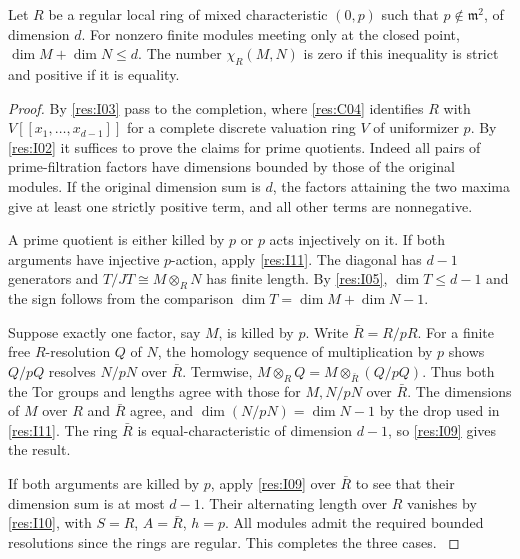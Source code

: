 \begin{theorem}\label{res:I12}
Let \(R\) be a regular local ring of mixed characteristic
\((0,p)\) such that \(p\notin\mathfrak m^2\), of dimension
\(d\). For nonzero finite modules meeting only at the closed
point, \(\dim M+\dim N\le d\). The number \(\chi_R(M,N)\)
is zero if this inequality is strict and positive if it is
equality.
\end{theorem}
\begin{proof}
By \ref{res:I03} pass to the completion, where \ref{res:C04}
identifies \(R\) with \(V[[x_1,\ldots,x_{d-1}]]\) for
a complete discrete valuation ring \(V\) of uniformizer \(p\).
By \ref{res:I02} it suffices to prove the claims for prime
quotients. Indeed all pairs of prime-filtration factors
have dimensions bounded by those of the original modules.
If the original dimension sum is \(d\), the factors attaining
the two maxima give at least one strictly positive term, and
all other terms are nonnegative.

A prime quotient is either killed by \(p\) or \(p\) acts
injectively on it. If both arguments have injective \(p\)-action,
apply \ref{res:I11}. The diagonal has \(d-1\) generators and
\(T/JT\cong M\otimes_R N\) has finite length. By \ref{res:I05},
\(\dim T\le d-1\) and the sign follows from the comparison
\(\dim T=\dim M+\dim N-1\).

Suppose exactly one factor, say \(M\), is killed by \(p\).
Write \(\bar R=R/pR\). For a finite free \(R\)-resolution
\(Q\) of \(N\), the homology sequence of multiplication by \(p\)
shows \(Q/pQ\) resolves \(N/pN\) over \(\bar R\). Termwise,
\(M\otimes_R Q=M\otimes_{\bar R}(Q/pQ)\). Thus both the
Tor groups and lengths agree with those for \(M,N/pN\) over
\(\bar R\). The dimensions of \(M\) over \(R\) and \(\bar R\)
agree, and \(\dim(N/pN)=\dim N-1\) by the drop used in
\ref{res:I11}. The ring \(\bar R\) is equal-characteristic
of dimension \(d-1\), so \ref{res:I09} gives the result.

If both arguments are killed by \(p\), apply \ref{res:I09}
over \(\bar R\) to see that their dimension sum is at most
\(d-1\). Their alternating length over \(R\) vanishes by
\ref{res:I10}, with \(S=R\), \(A=\bar R\), \(h=p\).
All modules admit the required bounded resolutions since the
rings are regular. This completes the three cases.
\cite[Chapter V, \S B.5, Theorem 2]{serre-local}
\end{proof}


